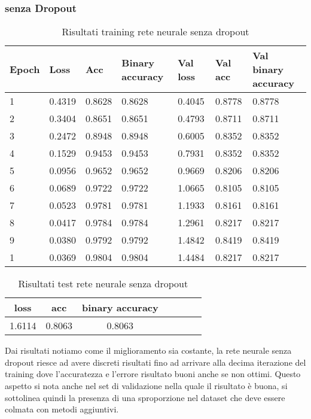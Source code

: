 \subsubsection{senza Dropout}
\renewcommand{\arraystretch}{1.4}
\begin{table}[H]
	\begin{center}
		\begin{tabular}{|p{1.2cm}|p{1.2cm}|p{1.2cm}|p{2cm}|p{1.2cm}|p{1.2cm}|p{2.5cm}|}
			\hline
			\textbf{Epoch} & \textbf{Loss}    & \textbf{Acc} & \textbf{Binary accuracy} & \textbf{Val loss} & \textbf{Val acc} & \textbf{Val binary accuracy}\\ \hline
			1 & 0.4319 & 0.8628 & 0.8628 & 0.4045 & 0.8778 & 0.8778 \\ \hline
			2 & 0.3404 & 0.8651 & 0.8651 & 0.4793 & 0.8711 & 0.8711 \\ \hline
			3 & 0.2472 & 0.8948 & 0.8948 & 0.6005 & 0.8352 & 0.8352 \\ \hline
			4 & 0.1529 & 0.9453 & 0.9453 & 0.7931 & 0.8352 & 0.8352 \\ \hline
			5 & 0.0956 & 0.9652 & 0.9652 & 0.9669 & 0.8206 & 0.8206 \\ \hline
			6 & 0.0689 & 0.9722 & 0.9722 & 1.0665 & 0.8105 & 0.8105 \\ \hline
			7 & 0.0523 & 0.9781 & 0.9781 & 1.1933 & 0.8161 & 0.8161 \\ \hline
			8 & 0.0417 & 0.9784 & 0.9784 & 1.2961 & 0.8217 & 0.8217 \\ \hline
			9 & 0.0380 & 0.9792 & 0.9792 & 1.4842 & 0.8419 & 0.8419 \\ \hline
			1 & 0.0369 & 0.9804 & 0.9804 & 1.4484 & 0.8217 & 0.8217 \\ \hline
		\end{tabular}
		\caption{Risultati training rete neurale senza dropout\label{}}
	\end{center}
\end{table}
\renewcommand{\arraystretch}{1}
\renewcommand{\arraystretch}{1.4}
\begin{table}[H]
	\begin{center}
		\begin{tabular}{|c|c|c|c|c|c|c|}
			\hline
			\textbf{loss} & \textbf{acc} & \textbf{binary accuracy} \\ \hline
			1.6114  & 0.8063 & 0.8063 \\ \hline
		\end{tabular}
		\caption{Risultati test rete neurale senza dropout\label{}}
	\end{center}
\end{table}
\renewcommand{\arraystretch}{1}
Dai risultati notiamo come il miglioramento sia costante, la rete neurale senza dropout riesce ad avere discreti risultati fino ad arrivare alla decima iterazione del training dove l'accuratezza e l'errore risultato buoni anche se non ottimi.
Questo aspetto si nota anche nel set di validazione nella quale il risultato è buona, si sottolinea quindi la presenza di una sproporzione nel dataset che deve essere colmata con metodi aggiuntivi.
